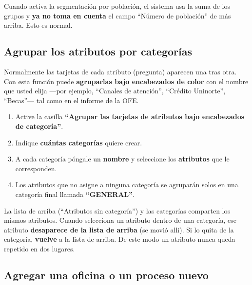 \documentclass[12pt, letterpaper]{article}
\begin{document}
\begin{aviso}
  Cuando activa la segmentación por población, el sistema usa la suma de los grupos y \textbf{ya no toma en cuenta} el campo ``Número de población'' de más arriba. Esto es normal.
\end{aviso}

\subsection{Agrupar los atributos por categorías}

Normalmente las tarjetas de cada atributo (pregunta) aparecen una tras otra. Con esta función puede \textbf{agruparlas bajo encabezados de color} con el nombre que usted elija —por ejemplo, ``Canales de atención'', ``Crédito Uninorte'', ``Becas''— tal como en el informe de la OFE.

\begin{enumerate}[leftmargin=1cm, label=\textcolor{verdepaso}{\arabic*.}]
  \item Active la casilla \textbf{``Agrupar las tarjetas de atributos bajo encabezados de categoría''}.
  \item Indique \textbf{cuántas categorías} quiere crear.
  \item A cada categoría póngale un \textbf{nombre} y seleccione los \textbf{atributos} que le corresponden.
  \item Los atributos que no asigne a ninguna categoría se agruparán solos en una categoría final llamada \textbf{``GENERAL''}.
\end{enumerate}

\begin{info}
  La lista de arriba (``Atributos sin categoría'') y las categorías comparten los mismos atributos. Cuando selecciona un atributo dentro de una categoría, ese atributo \textbf{desaparece de la lista de arriba} (se movió allí). Si lo quita de la categoría, \textbf{vuelve} a la lista de arriba. De este modo un atributo nunca queda repetido en dos lugares.
\end{info}

\subsection{Agregar una oficina o un proceso nuevo}
\end{document}
